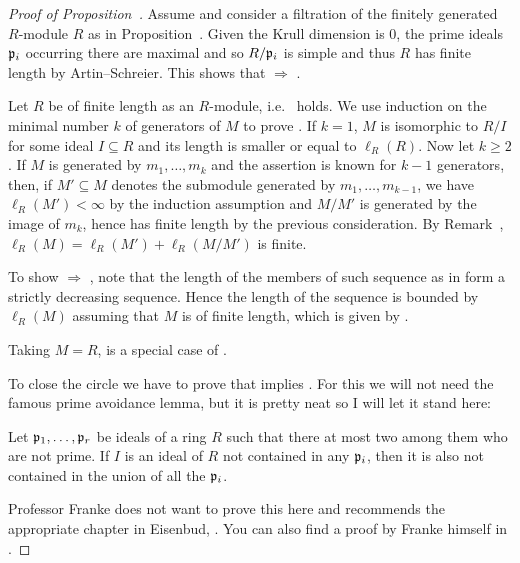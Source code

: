 \documentclass[a4paper,parskip=half,numbers=enddot, DIV=12]{scrreprt}
\begin{document}
\begin{proof}[Proof of Proposition~]
    Assume  and consider a filtration of the finitely generated $R$-module $R$ as in Proposition~. Given the Krull dimension is $0$, the prime ideals $\mathfrak{p}_i$ occurring there are maximal and so $R/\mathfrak{p}_i$ is simple and thus $R$ has finite length by Artin--Schreier. This shows that  $\Rightarrow$ .
    
    Let $R$ be of finite length as an $R$-module, i.e.\  holds. We use induction on the minimal number $k$ of generators of $M$ to prove . If $k=1$, $M$ is isomorphic to $R/I$ for some ideal $I\subseteq R$ and its length is smaller or equal to $\ell_R(R)$. Now let $k\geq 2$. If $M$ is generated by $m_1,\ldots, m_k$ and the assertion is known for $k-1$ generators, then, if $M'\subseteq M$ denotes the submodule generated by $m_1,\ldots, m_{k-1}$, we have $\ell_R(M') < \infty$ by the induction assumption and $M/M'$ is generated by the image of $m_k$, hence has finite length by the previous consideration. By Remark~, $\ell_R(M)=\ell_R(M')+\ell_R(M/M')$ is finite.
    
    To show  $\Rightarrow$ , note that the length of the members of such sequence as in  form a strictly decreasing sequence. Hence the length of the sequence is bounded by $\ell_R(M)$ assuming that $M$ is of finite length, which is given by .
    
    Taking $M=R$,  is a special case of .
    
    To close the circle we have to prove that  implies . For this we will not need the famous prime avoidance lemma, but it is pretty neat so I will let it stand here:
    
    \begin{lem}
        Let $\mathfrak{p}_1,\ldots, \mathfrak{p}_r$ be ideals of a ring $R$ such that there at most two among them who are not prime. If $I$ is an ideal of $R$ not contained in any $\mathfrak{p}_i$, then it is also not contained in the union of all the $\mathfrak{p}_i$. 
    \end{lem}
    Professor Franke does not want to prove this here and recommends the appropriate chapter in Eisenbud, \cite[Section~3.2]{eisenbudCommAlg}. You can also find a proof by Franke himself in \cite[Lemma~2.5.1]{alg1}.
    

\end{proof}
\end{document}
